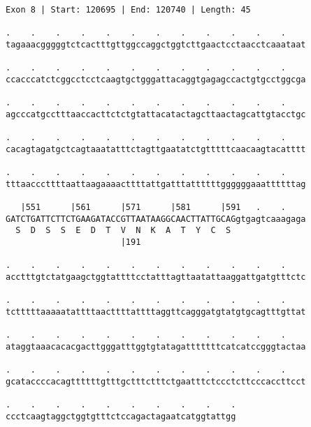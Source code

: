 \documentclass{article}
\begin{document}
\begin{Verbatim}[fontfamily=courier]
Exon 8 | Start: 120695 | End: 120740 | Length: 45

.    .    .    .    .    .    .    .    .    .    .    .    
tagaaacgggggtctcactttgttggccaggctggtcttgaactcctaacctcaaataat

.    .    .    .    .    .    .    .    .    .    .    .    
ccacccatctcggcctcctcaagtgctgggattacaggtgagagccactgtgcctggcga

.    .    .    .    .    .    .    .    .    .    .    .    
agcccatgcctttaaccacttctctgtattacatactagcttaactagcattgtacctgc

.    .    .    .    .    .    .    .    .    .    .    .    
cacagtagatgctcagtaaatatttctagttgaatatctgtttttcaacaagtacatttt

.    .    .    .    .    .    .    .    .    .    .    .    
tttaacccttttaattaagaaaacttttattgatttattttttggggggaaattttttag

   |551      |561      |571      |581      |591   .    .    
GATCTGATTCTTCTGAAGATACCGTTAATAAGGCAACTTATTGCAGgtgagtcaaagaga
  S  D  S  S  E  D  T  V  N  K  A  T  Y  C  S               
                       |191                                 

.    .    .    .    .    .    .    .    .    .    .    .    
acctttgtctatgaagctggtattttcctatttagttaatattaaggattgatgtttctc

.    .    .    .    .    .    .    .    .    .    .    .    
tctttttaaaaatattttaacttttattttaggttcagggatgtatgtgcagtttgttat

.    .    .    .    .    .    .    .    .    .    .    .    
ataggtaaacacacgacttgggatttggtgtatagatttttttcatcatccgggtactaa

.    .    .    .    .    .    .    .    .    .    .    .    
gcataccccacagttttttgtttgctttctttctgaatttctccctcttcccaccttcct

.    .    .    .    .    .    .    .    .    .
ccctcaagtaggctggtgtttctccagactagaatcatggtattgg
\end{Verbatim}
\newpage
\end{document}
